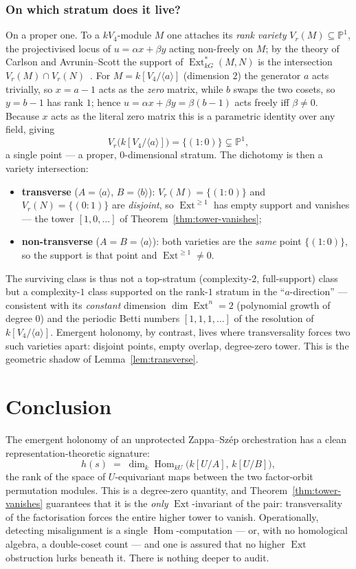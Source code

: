 \documentclass[11pt]{amsart}
\theoremstyle{plain}
\theoremstyle{definition}
\DeclareMathOperator{\Hom}{Hom}
\DeclareMathOperator{\Ext}{Ext}
\begin{document}
\subsubsection*{On which stratum does it live?}
On a proper one. To a $kV_4$-module $M$ one attaches its \emph{rank variety}
$V_r(M)\subseteq\mathbb{P}^1$, the projectivised locus of $u=\alpha x+\beta y$ acting
non-freely on $M$; by the theory of Carlson and Avrunin--Scott the support of
$\Ext^*_{kG}(M,N)$ is the intersection $V_r(M)\cap
V_r(N)$~\cite{carlson-varieties,avrunin-scott,benson2}. For $M=k[V_4/\langle a\rangle]$
(dimension $2$) the generator $a$ acts trivially, so $x=a-1$ acts as the \emph{zero} matrix,
while $b$ swaps the two cosets, so $y=b-1$ has rank $1$; hence $u=\alpha x+\beta y=\beta(b-1)$
acts freely iff $\beta\ne 0$. Because $x$ acts as the literal zero matrix this is a
parametric identity over any field, giving
\[
   V_r\bigl(k[V_4/\langle a\rangle]\bigr)=\{(1{:}0)\}\subsetneq\mathbb{P}^1,
\]
a single point --- a proper, $0$-dimensional stratum. The dichotomy is then a variety
intersection:
\begin{itemize}
\item \textbf{transverse} ($A=\langle a\rangle$, $B=\langle b\rangle$): $V_r(M)=\{(1{:}0)\}$
   and $V_r(N)=\{(0{:}1)\}$ are \emph{disjoint}, so $\Ext^{\ge1}$ has empty support and
   vanishes --- the tower $[1,0,\dots]$ of Theorem~\ref{thm:tower-vanishes};
\item \textbf{non-transverse} ($A=B=\langle a\rangle$): both varieties are the \emph{same}
   point $\{(1{:}0)\}$, so the support is that point and $\Ext^{\ge1}\ne 0$.
\end{itemize}
The surviving class is thus not a top-stratum (complexity-$2$, full-support) class but a
complexity-$1$ class supported on the rank-$1$ stratum in the ``$a$-direction'' ---
consistent with its \emph{constant} dimension $\dim\Ext^n=2$ (polynomial growth of degree
$0$) and the periodic Betti numbers $[1,1,1,\dots]$ of the resolution of
$k[V_4/\langle a\rangle]$. Emergent holonomy, by contrast, lives where transversality forces
two such varieties apart: disjoint points, empty overlap, degree-zero tower. This is the
geometric shadow of Lemma~\ref{lem:transverse}.

\section{Conclusion}\label{sec:conclusion}

The emergent holonomy of an unprotected Zappa--Sz\'ep orchestration has a clean
representation-theoretic signature:
\[
   h(s)\;=\;\dim_k\Hom_{kU}\!\bigl(k[U/A],\,k[U/B]\bigr),
\]
the rank of the space of $U$-equivariant maps between the two factor-orbit permutation
modules. This is a degree-zero quantity, and Theorem~\ref{thm:tower-vanishes} guarantees
that it is the \emph{only} $\Ext$-invariant of the pair: transversality of the factorisation
forces the entire higher tower to vanish. Operationally, detecting misalignment is a single
$\Hom$-computation --- or, with no homological algebra, a double-coset count --- and one is
assured that no higher $\Ext$ obstruction lurks beneath it. There is nothing deeper to audit.
\end{document}
